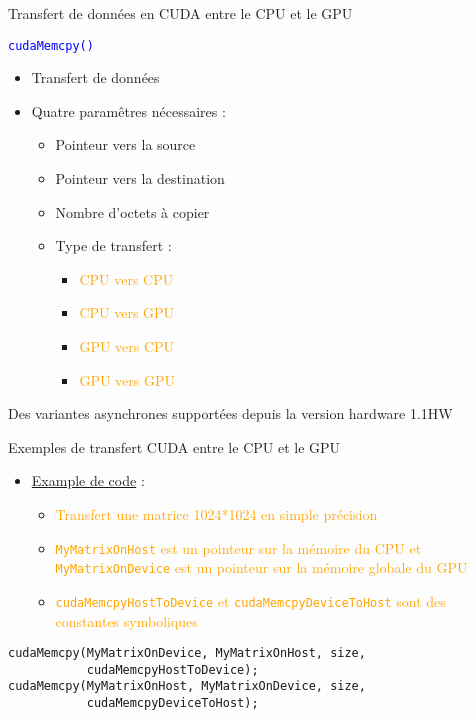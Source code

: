 \documentclass{beamer}
\begin{document}
\begin{frame}{Transfert de données en CUDA entre le CPU et le GPU}

\textcolor{blue}{\Large\tt cudaMemcpy()}
\begin{itemize}
\item Transfert de données
\item Quatre paramêtres nécessaires :
  \begin{itemize}
  \item Pointeur vers la source
  \item Pointeur vers la destination
  \item Nombre d'octets à copier
  \item Type de transfert :
    \begin{itemize}
    \item \textcolor{orange}{CPU vers CPU}
    \item \textcolor{orange}{CPU vers GPU}
    \item \textcolor{orange}{GPU vers CPU}
    \item \textcolor{orange}{GPU vers GPU}
    \end{itemize}
  \end{itemize}
\end{itemize}
Des variantes asynchrones supportées depuis la version hardware 1.1HW
\end{frame}

\begin{frame}[containsverbatim]{Exemples de transfert CUDA entre le CPU et le GPU}
\begin{itemize}
\item \underline{Example de code} :
  \begin{itemize}
  \item \textcolor{orange}{Transfert une matrice 1024*1024 en simple précision}
  \item \textcolor{orange}{\texttt{MyMatrixOnHost} est un pointeur sur la mémoire du CPU
      et \texttt{MyMatrixOnDevice} est un pointeur sur la mémoire globale du GPU}
  \item \textcolor{orange}{\texttt{cudaMemcpyHostToDevice} et
      \texttt{cudaMemcpyDeviceToHost} sont des constantes symboliques}
  \end{itemize}
\end{itemize}
\begin{lstlisting}
cudaMemcpy(MyMatrixOnDevice, MyMatrixOnHost, size,
           cudaMemcpyHostToDevice);
cudaMemcpy(MyMatrixOnHost, MyMatrixOnDevice, size,
           cudaMemcpyDeviceToHost);
\end{lstlisting}
\end{frame}
\end{document}

